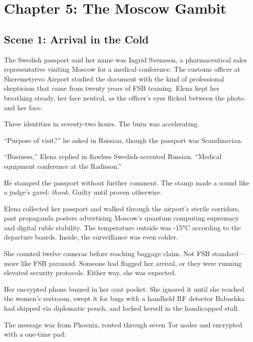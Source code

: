 \hypertarget{chapter-5-the-moscow-gambit}{%
\section{Chapter 5: The Moscow Gambit}\label{chapter-5-the-moscow-gambit}}

\hypertarget{scene-1-arrival-in-the-cold}{%
\subsection{Scene 1: Arrival in the Cold}\label{scene-1-arrival-in-the-cold}}

The Swedish passport said her name was Ingrid Svensson, a pharmaceutical sales representative visiting Moscow for a medical conference. The customs officer at Sheremetyevo Airport studied the document with the kind of professional skepticism that came from twenty years of FSB training. Elena kept her breathing steady, her face neutral, as the officer's eyes flicked between the photo and her face.

Three identities in seventy-two hours. The burn was accelerating.

``Purpose of visit?'' he asked in Russian, though the passport was Scandinavian.

``Business,'' Elena replied in flawless Swedish-accented Russian. ``Medical equipment conference at the Radisson.''

He stamped the passport without further comment. The stamp made a sound like a judge's gavel: \emph{thunk}. Guilty until proven otherwise.

Elena collected her passport and walked through the airport's sterile corridors, past propaganda posters advertising Moscow's quantum computing supremacy and digital ruble stability. The temperature outside was -15°C according to the departure boards. Inside, the surveillance was even colder.

She counted twelve cameras before reaching baggage claim. Not FSB standard---more like FSB paranoid. Someone had flagged her arrival, or they were running elevated security protocols. Either way, she was expected.

Her encrypted phone buzzed in her coat pocket. She ignored it until she reached the women's restroom, swept it for bugs with a handheld RF detector Babushka had shipped via diplomatic pouch, and locked herself in the handicapped stall.

The message was from Phoenix, routed through seven Tor nodes and encrypted with a one-time pad:

